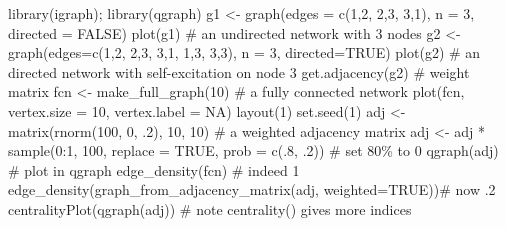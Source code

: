 \documentclass[
  a4paper,
  DIV=11,
  numbers=noendperiod,
  oneside]{scrreprt}
\newenvironment{Shaded}{}{}
\newcommand{\AttributeTok}[1]{\textcolor[rgb]{0.84,0.23,0.29}{#1}}
\newcommand{\CommentTok}[1]{\textcolor[rgb]{0.42,0.45,0.49}{#1}}
\newcommand{\ConstantTok}[1]{\textcolor[rgb]{0.00,0.36,0.77}{#1}}
\newcommand{\DecValTok}[1]{\textcolor[rgb]{0.00,0.36,0.77}{#1}}
\newcommand{\FunctionTok}[1]{\textcolor[rgb]{0.44,0.26,0.76}{#1}}
\newcommand{\NormalTok}[1]{\textcolor[rgb]{0.14,0.16,0.18}{#1}}
\newcommand{\OtherTok}[1]{\textcolor[rgb]{0.44,0.26,0.76}{#1}}
\newcommand{\SpecialCharTok}[1]{\textcolor[rgb]{0.00,0.36,0.77}{#1}}
\begin{document}
\begin{Shaded}
\begin{Highlighting}[]
\FunctionTok{library}\NormalTok{(igraph); }\FunctionTok{library}\NormalTok{(qgraph)}
\NormalTok{g1 }\OtherTok{\textless{}{-}} \FunctionTok{graph}\NormalTok{(}\AttributeTok{edges =} \FunctionTok{c}\NormalTok{(}\DecValTok{1}\NormalTok{,}\DecValTok{2}\NormalTok{, }\DecValTok{2}\NormalTok{,}\DecValTok{3}\NormalTok{, }\DecValTok{3}\NormalTok{,}\DecValTok{1}\NormalTok{),}
            \AttributeTok{n =} \DecValTok{3}\NormalTok{, }\AttributeTok{directed =} \ConstantTok{FALSE}\NormalTok{) }
\FunctionTok{plot}\NormalTok{(g1) }\CommentTok{\# an undirected network with 3 nodes}
\NormalTok{g2 }\OtherTok{\textless{}{-}} \FunctionTok{graph}\NormalTok{(}\AttributeTok{edges=}\FunctionTok{c}\NormalTok{(}\DecValTok{1}\NormalTok{,}\DecValTok{2}\NormalTok{, }\DecValTok{2}\NormalTok{,}\DecValTok{3}\NormalTok{, }\DecValTok{3}\NormalTok{,}\DecValTok{1}\NormalTok{, }\DecValTok{1}\NormalTok{,}\DecValTok{3}\NormalTok{, }\DecValTok{3}\NormalTok{,}\DecValTok{3}\NormalTok{),}
            \AttributeTok{n =} \DecValTok{3}\NormalTok{, }\AttributeTok{directed=}\ConstantTok{TRUE}\NormalTok{)}
\FunctionTok{plot}\NormalTok{(g2) }\CommentTok{\# an directed network with self{-}excitation on node 3}
\FunctionTok{get.adjacency}\NormalTok{(g2) }\CommentTok{\# weight matrix}
\NormalTok{fcn }\OtherTok{\textless{}{-}} \FunctionTok{make\_full\_graph}\NormalTok{(}\DecValTok{10}\NormalTok{) }\CommentTok{\# a fully connected network}
\FunctionTok{plot}\NormalTok{(fcn, }\AttributeTok{vertex.size =} \DecValTok{10}\NormalTok{, }\AttributeTok{vertex.label =} \ConstantTok{NA}\NormalTok{)}
\FunctionTok{layout}\NormalTok{(}\DecValTok{1}\NormalTok{)}
\FunctionTok{set.seed}\NormalTok{(}\DecValTok{1}\NormalTok{)}
\NormalTok{adj }\OtherTok{\textless{}{-}} \FunctionTok{matrix}\NormalTok{(}\FunctionTok{rnorm}\NormalTok{(}\DecValTok{100}\NormalTok{, }\DecValTok{0}\NormalTok{, .}\DecValTok{2}\NormalTok{), }\DecValTok{10}\NormalTok{, }\DecValTok{10}\NormalTok{) }\CommentTok{\# a weighted adjacency matrix}
\NormalTok{adj }\OtherTok{\textless{}{-}}\NormalTok{ adj }\SpecialCharTok{*} \FunctionTok{sample}\NormalTok{(}\DecValTok{0}\SpecialCharTok{:}\DecValTok{1}\NormalTok{, }\DecValTok{100}\NormalTok{, }\AttributeTok{replace =} \ConstantTok{TRUE}\NormalTok{, }
                    \AttributeTok{prob =} \FunctionTok{c}\NormalTok{(.}\DecValTok{8}\NormalTok{, .}\DecValTok{2}\NormalTok{)) }\CommentTok{\# set 80\% to 0}
\FunctionTok{qgraph}\NormalTok{(adj) }\CommentTok{\# plot in qgraph}
\FunctionTok{edge\_density}\NormalTok{(fcn) }\CommentTok{\# indeed 1}
\FunctionTok{edge\_density}\NormalTok{(}\FunctionTok{graph\_from\_adjacency\_matrix}\NormalTok{(adj, }\AttributeTok{weighted=}\ConstantTok{TRUE}\NormalTok{))}\CommentTok{\# now .2}
\FunctionTok{centralityPlot}\NormalTok{(}\FunctionTok{qgraph}\NormalTok{(adj)) }\CommentTok{\# note centrality() gives more indices}
\end{Highlighting}
\end{Shaded}
\end{document}
